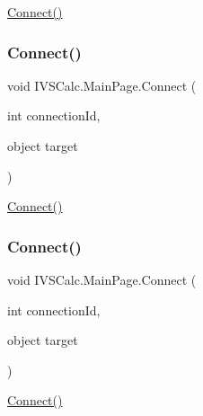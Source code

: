 \hyperlink{class_i_v_s_calc_1_1_main_page_a36a7263a9c76a6fdfa392266c3b56122}{Connect()} 

\mbox{\label{class_i_v_s_calc_1_1_main_page_a36a7263a9c76a6fdfa392266c3b56122}} 
\subsubsection{\texorpdfstring{Connect()}{Connect()}\hspace{0.1cm}{\footnotesize\ttfamily [3/5]}}
{\footnotesize\ttfamily void I\+V\+S\+Calc.\+Main\+Page.\+Connect (\begin{DoxyParamCaption}\item[{int}]{connection\+Id,  }\item[{object}]{target }\end{DoxyParamCaption})}



\hyperlink{class_i_v_s_calc_1_1_main_page_a36a7263a9c76a6fdfa392266c3b56122}{Connect()} 

\mbox{\label{class_i_v_s_calc_1_1_main_page_a36a7263a9c76a6fdfa392266c3b56122}} 
\subsubsection{\texorpdfstring{Connect()}{Connect()}\hspace{0.1cm}{\footnotesize\ttfamily [4/5]}}
{\footnotesize\ttfamily void I\+V\+S\+Calc.\+Main\+Page.\+Connect (\begin{DoxyParamCaption}\item[{int}]{connection\+Id,  }\item[{object}]{target }\end{DoxyParamCaption})}



\hyperlink{class_i_v_s_calc_1_1_main_page_a36a7263a9c76a6fdfa392266c3b56122}{Connect()} 

\mbox{\label{class_i_v_s_calc_1_1_main_page_a36a7263a9c76a6fdfa392266c3b56122}} 
